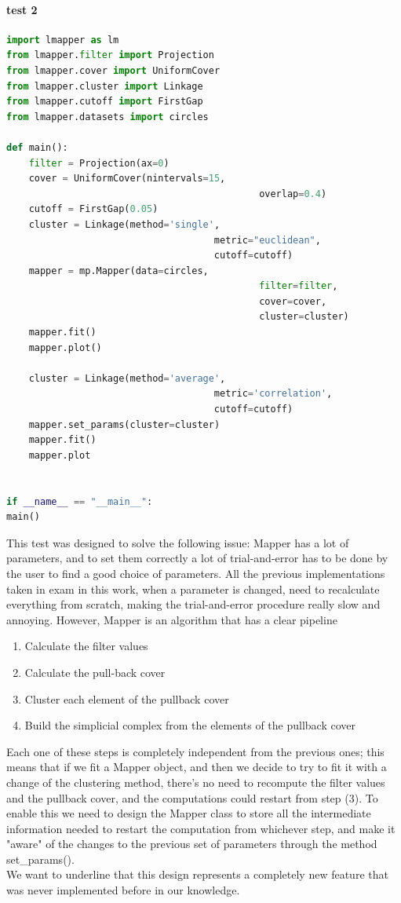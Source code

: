 \paragraph{test 2}
\begin{lstlisting}[language=Python, caption=Second test for Mapper]
import lmapper as lm
from lmapper.filter import Projection
from lmapper.cover import UniformCover
from lmapper.cluster import Linkage
from lmapper.cutoff import FirstGap
from lmapper.datasets import circles

def main():
	filter = Projection(ax=0)
	cover = UniformCover(nintervals=15,
											 overlap=0.4)
	cutoff = FirstGap(0.05)
 	cluster = Linkage(method='single',
									 metric="euclidean",
									 cutoff=cutoff)
	mapper = mp.Mapper(data=circles,
											 filter=filter,
											 cover=cover,
											 cluster=cluster)
	mapper.fit()
	mapper.plot()
	
	cluster = Linkage(method='average',
									 metric='correlation',
									 cutoff=cutoff)
	mapper.set_params(cluster=cluster)
	mapper.fit()
	mapper.plot


if __name__ == "__main__":
main()

\end{lstlisting}
This test was designed to solve the following issue: Mapper has a lot of parameters, and to set them correctly a lot of trial-and-error has to be done by the user to find a good choice of parameters. All the previous implementations taken in exam in this work, when a parameter is changed, need to recalculate everything from scratch, making the trial-and-error procedure really slow and annoying. However, Mapper is an algorithm that has a clear pipeline
\begin{enumerate}
	\item Calculate the filter values
	\item Calculate the pull-back cover
	\item Cluster each element of the pullback cover
	\item Build the simplicial complex from the elements of the pullback cover
\end{enumerate}
Each one of these steps is completely independent from the previous ones; this means that if we fit a Mapper object, and then we decide to try to fit it with a change of the clustering method, there's no need to recompute the filter values and the pullback cover, and the computations could restart from step (3). To enable this we need to design the Mapper class to store all the intermediate information needed to restart the computation from whichever step, and make it "aware" of the changes to the previous set of parameters through the method set\_params().\\
We want to underline that this design represents a completely new feature that was never implemented before in our knowledge.\\
